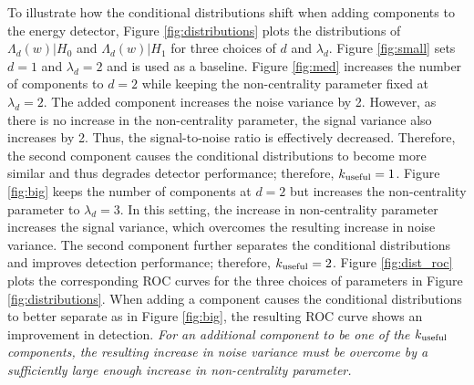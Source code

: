 To illustrate how the conditional distributions shift when adding components to the energy
detector, Figure \ref{fig:distributions} plots the distributions of $\Lambda_d(w)|H_0$ and
$\Lambda_d(w)|H_1$ for three choices of $d$ and $\lambda_d$. Figure \ref{fig:small} sets
$d=1$ and $\lambda_d=2$ and is used as a baseline. Figure \ref{fig:med} increases the
number of components to $d=2$ while keeping the non-centrality parameter fixed at
$\lambda_d=2$. The added component increases the noise variance by 2. However, as there is
no increase in the non-centrality parameter, the signal variance also increases by
2. Thus, the signal-to-noise ratio is effectively decreased. Therefore, the second
component causes the conditional distributions to become more similar and thus degrades
detector performance; therefore, $k_{\text{useful}}=1$. Figure \ref{fig:big} keeps the number of
components at $d=2$ but increases the non-centrality parameter to $\lambda_d=3$. In this
setting, the increase in non-centrality parameter increases the signal variance, which
overcomes the resulting increase in noise variance. The second component further separates
the conditional distributions and improves detection performance; therefore,
$k_{\text{useful}}=2$. Figure \ref{fig:dist_roc} plots the corresponding ROC curves for the three
choices of parameters in Figure \ref{fig:distributions}. When adding a component causes
the conditional distributions to better separate as in Figure \ref{fig:big}, the resulting
ROC curve shows an improvement in detection. \textit{For an additional component to be one
  of the $k_{\text{useful}}$ components, the resulting increase in noise variance must be overcome by
  a sufficiently large enough increase in non-centrality parameter.}

